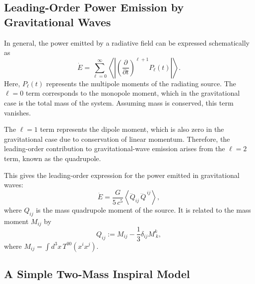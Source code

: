 \documentclass{article}
\begin{document}

\subsection*{Leading-Order Power Emission by Gravitational Waves}
\label{subsec:GW_power}

In general, the power emitted by a radiative field can be expressed schematically as
\begin{equation}
    \dot{E} = \sum_{\ell = 0}^{\infty} \left\langle \left| \left( \frac{\partial}{\partial t} \right)^{\ell+1} P_\ell(t) \right| \right\rangle.
\end{equation}
Here, \(P_{\ell}(t)\) represents the multipole moments of the radiating source. The \(\ell = 0\) term corresponds to the monopole moment, which in the gravitational case is the total mass of the system. Assuming mass is conserved, this term vanishes.

\noindent
The \(\ell = 1\) term represents the dipole moment, which is also zero in the gravitational case due to conservation of linear momentum. Therefore, the leading-order contribution to gravitational-wave emission arises from the \(\ell = 2\) term, known as the quadrupole.

\noindent
This gives the leading-order expression for the power emitted in gravitational waves:
\begin{equation}
\dot{E} = \frac{G}{5\,c^5}
\left\langle \dddot{Q}_{ij}\,\dddot{Q}^{\,ij} \right\rangle,
\end{equation}
where \(Q_{ij}\) is the mass quadrupole moment of the source. It is related to the mass moment \(M_{ij}\) by
\begin{equation}
Q_{ij} := M_{ij} - \frac{1}{3} \delta_{ij} M^k_{\ k},
\end{equation}
where \(M_{ij} = \int d^3x\, T^{00}(x^i x^j)\).



\subsection*{A Simple Two-Mass Inspiral Model}
\label{subsec:two_mass_example}
\end{document}
